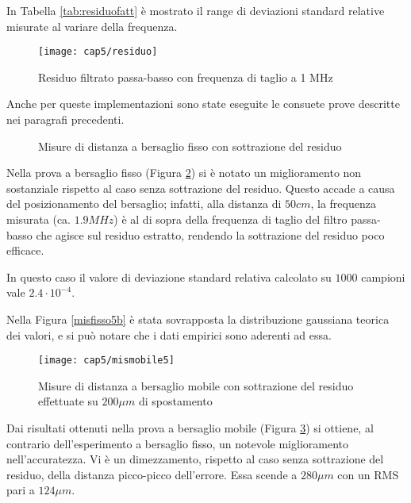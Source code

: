 In Tabella \ref{tab:residuofatt} è mostrato il range di deviazioni standard relative misurate al variare della frequenza.
\begin{figure}  
  \begin{center}
    \texttt{[image: cap5/residuo]}
    \caption{Residuo filtrato passa-basso con frequenza di taglio a 1 MHz}
    \label{residuo}
  \end{center}
\end{figure}

Anche per queste implementazioni sono state eseguite le consuete prove descritte nei paragrafi precedenti.
\begin{figure}
\centering
{}
\hspace{5mm}
\caption{Misure di distanza a bersaglio fisso con sottrazione del residuo}\label{misfisso5}
\end{figure}

Nella prova a bersaglio fisso (Figura \ref{misfisso5}) si è notato un miglioramento non sostanziale rispetto al caso senza sottrazione del residuo. Questo accade a causa del posizionamento del bersaglio; infatti, alla distanza di $50 cm$, la frequenza misurata (ca. $1.9MHz$) è al di sopra della frequenza di taglio del filtro passa-basso che agisce sul residuo estratto, rendendo la sottrazione del residuo poco efficace.

In questo caso il valore di deviazione standard relativa calcolato su $1000$ campioni vale $2.4 \cdot 10^{-4}$.

Nella Figura \ref{misfisso5b} è stata sovrapposta la distribuzione gaussiana teorica dei valori, e si può notare che i dati empirici sono aderenti ad essa.

\begin{figure}  
  \begin{center}
    \texttt{[image: cap5/mismobile5]}
    \caption{Misure di distanza a bersaglio mobile con sottrazione del residuo effettuate su $200 \mu m$ di spostamento}
    \label{mismobile5}
  \end{center}
\end{figure}

Dai risultati ottenuti nella prova a bersaglio mobile (Figura \ref{mismobile5}) si ottiene, al contrario dell'esperimento a bersaglio fisso, un notevole miglioramento nell'accuratezza. Vi è un dimezzamento, rispetto al caso senza sottrazione del residuo, della distanza picco-picco dell'errore. Essa scende a $280 \mu m$ con un RMS pari a $124 \mu m$.

